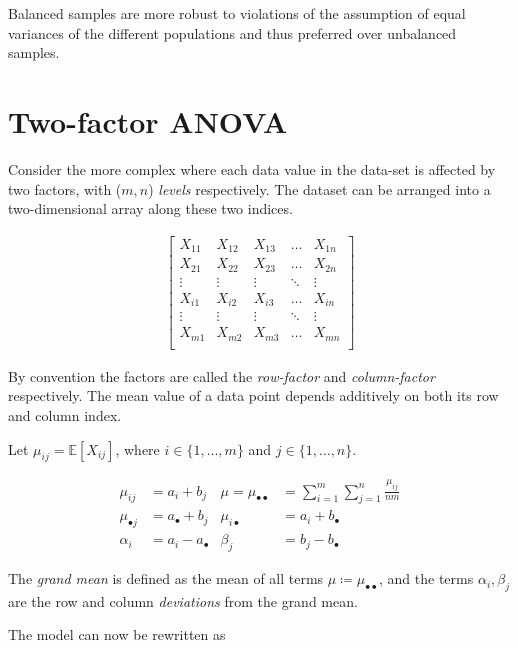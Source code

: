 Balanced samples are more robust to violations of the assumption of equal variances of the different populations and thus preferred over unbalanced samples.

\section{Two-factor ANOVA}

Consider the more complex where each data value in the data-set is affected by two factors, with ($ m, n $) \textit{levels} respectively. The dataset can be arranged into a two-dimensional array along these two indices.

\begin{align}
	\begin{bmatrix}
		X_{11} & X_{12} & X_{13} & \dots & X_{1n} \\
		X_{21} & X_{22} & X_{23} & \dots & X_{2n} \\
		\vdots & \vdots & \vdots & \ddots & \vdots \\
		X_{i1} & X_{i2} & X_{i3} & \dots & X_{in} \\
		\vdots & \vdots & \vdots & \ddots & \vdots \\
		X_{m1} & X_{m2} & X_{m3} & \dots & X_{mn} \\
	\end{bmatrix}
\end{align}

By convention the factors are called the \textit{row-factor} and \textit{column-factor} respectively. The mean value of a data point depends additively on both its row and column index.

Let $ \mu_{ij} = \mathbb{E}[X_{ij}] $, where $ i \in \{1, \dots, m\} $ and $ j \in \{1, \dots, n\} $.

\begin{align}
	\mu_{ij} &= a_i + b_j & \mu = \mu_{\bullet\bullet} &= \sum\limits_{i = 1}^{m} \sum\limits_{j = 1}^{n} \frac{\mu_{ij}}{nm} \\
	\mu_{\bullet j} &= a_{\bullet} + b_j & \mu_{i \bullet} &= a_{i} + b_{\bullet} \\
	\alpha_i &= a_i - a_{\bullet} & \beta_j &= b_j - b_{\bullet}
\end{align}

The \textit{grand mean} is defined as the mean of all terms $ \mu \coloneqq \mu_{\bullet \bullet} $, and the terms $ \alpha_i, \beta_j $ are the row and column \textit{deviations} from the grand mean.

The model can now be rewritten as

